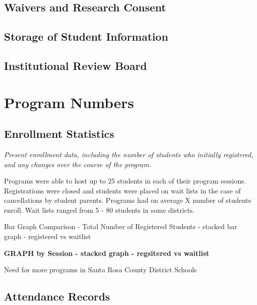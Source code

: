 \documentclass[
]{article}
\begin{document}
\hypertarget{waivers-and-research-consent}{%
\subsection{Waivers and Research
Consent}\label{waivers-and-research-consent}}

\hypertarget{storage-of-student-information}{%
\subsection{Storage of Student
Information}\label{storage-of-student-information}}

\hypertarget{institutional-review-board}{%
\subsection{Institutional Review
Board}\label{institutional-review-board}}

\hypertarget{program-numbers}{%
\section{Program Numbers}\label{program-numbers}}

\hypertarget{enrollment-statistics}{%
\subsection{Enrollment Statistics}\label{enrollment-statistics}}

\emph{Present enrollment data, including the number of students who
initially registered, and any changes over the course of the program.}

Programs were able to host up to 25 students in each of their program
sessions. Registrations were closed and students were placed on wait
lists in the case of cancellations by student parents. Programs had on
average X number of students enroll. Wait lists ranged from 5 - 80
students in some districts.

Bar Graph Comparison - Total Number of Registered Students - stacked bar
graph - registered vs waitlist

\textbf{GRAPH by Session - stacked graph - regsitered vs waitlist}

Need for more programs in Santa Rosa County District Schools

\hypertarget{attendance-records}{%
\subsection{Attendance Records}\label{attendance-records}}
\end{document}
